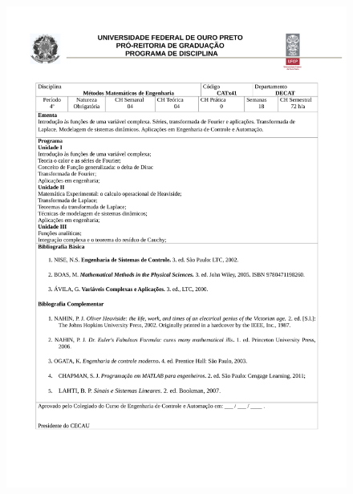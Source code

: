 \begin{figure}[p]
	\centering 
	\includegraphics[scale=0.7]{capitulos/anexo1-programas-disciplina/p43.pdf}
\end{figure}

